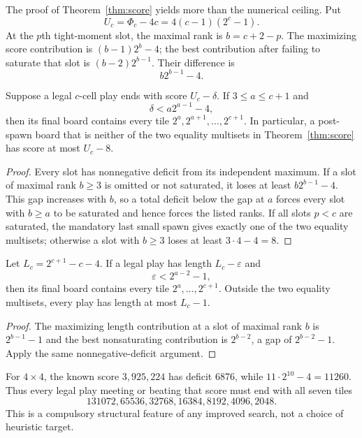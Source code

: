 The proof of Theorem~\ref{thm:score} yields more than the numerical
ceiling.  Put
\[
 U_c=\Phi_c-4c=4(c-1)(2^c-1).
\]
At the $p$th tight-moment slot, the maximal rank is
$b=c+2-p$.  The maximizing score contribution is
$(b-1)2^b-4$; the best contribution after failing to saturate that slot is
$(b-2)2^{b-1}$.  Their difference is
\[
 b2^{b-1}-4.
\]

\begin{theorem}\label{thm:scorerigidity}
Suppose a legal $c$-cell play ends with score $U_c-\delta$.  If
$3\le a\le c+1$ and
\[
 \delta<a2^{a-1}-4,
\]
then its final board contains every tile
$2^a,2^{a+1},\ldots,2^{c+1}$.  In particular, a post-spawn board that is
neither of the two equality multisets in Theorem~\ref{thm:score} has
score at most $U_c-8$.
\end{theorem}
\begin{proof}
Every slot has nonnegative deficit from its independent maximum.  If a
slot of maximal rank $b\ge3$ is omitted or not saturated, it loses at
least $b2^{b-1}-4$.  This gap increases with $b$, so a total deficit below
the gap at $a$ forces every slot with $b\ge a$ to be saturated and hence
forces the listed ranks.  If all slots $p<c$ are saturated, the mandatory
last small spawn gives exactly one of the two equality multisets; otherwise
a slot with $b\ge3$ loses at least $3\cdot4-4=8$.
\end{proof}

\begin{corollary}\label{cor:lengthrigidity}
Let $L_c=2^{c+1}-c-4$.  If a legal play has length
$L_c-\varepsilon$ and
\[
 \varepsilon<2^{a-2}-1,
\]
then its final board contains every tile $2^a,\ldots,2^{c+1}$.  Outside
the two equality multisets, every play has length at most $L_c-1$.
\end{corollary}
\begin{proof}
The maximizing length contribution at a slot of maximal rank $b$ is
$2^{b-1}-1$ and the best nonsaturating contribution is $2^{b-2}$, a gap
of $2^{b-2}-1$.  Apply the same nonnegative-deficit argument.
\end{proof}

For $4\times4$, the known score $3{,}925{,}224$ has deficit 6876, while
$11\cdot2^{10}-4=11260$.  Thus every legal play meeting or beating that
score must end with all seven tiles
\[
131072,65536,32768,16384,8192,4096,2048.
\]
This is a compulsory structural feature of any improved search, not a
choice of heuristic target.


